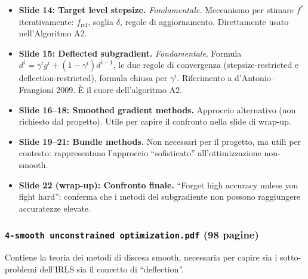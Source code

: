 \documentclass[a4paper,11pt]{article}
\theoremstyle{definition}
\begin{document}
\begin{itemize}
  \item \textbf{Slide 14: Target level stepsize.} \emph{Fondamentale.} Meccanismo per stimare $f^*$ iterativamente: $f_{\text{ref}}$, soglia $\delta$, regole di aggiornamento. Direttamente usato nell'Algoritmo A2.

  \item \textbf{Slide 15: Deflected subgradient.} \emph{Fondamentale.} Formula $d^i = \gamma^i g^i + (1-\gamma^i)d^{i-1}$, le due regole di convergenza (stepsize-restricted e deflection-restricted), formula chiusa per $\gamma^i$. Riferimento a d'Antonio--Frangioni 2009. È il cuore dell'algoritmo A2.

  \item \textbf{Slide 16--18: Smoothed gradient methods.} Approccio alternativo (non richiesto dal progetto). Utile per capire il confronto nella slide di wrap-up.

  \item \textbf{Slide 19--21: Bundle methods.} Non necessari per il progetto, ma utili per contesto: rappresentano l'approccio ``sofisticato'' all'ottimizzazione non-smooth.

  \item \textbf{Slide 22 (wrap-up): Confronto finale.} ``Forget high accuracy unless you fight hard'': conferma che i metodi del subgradiente non possono raggiungere accuratezze elevate.
\end{itemize}

\subsubsection*{ \quad \texttt{4-smooth unconstrained optimization.pdf} (98 pagine)}

Contiene la teoria dei metodi di discesa smooth, necessaria per capire sia i sotto-problemi dell'IRLS sia il concetto di ``deflection''.
\end{document}
